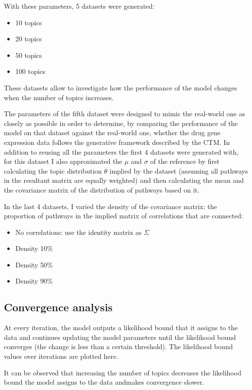 \documentclass[12pt,a4paper,twoside,openright]{report}
\begin{document}
With these parameters, 5 datasets were generated:

\begin{itemize}[noitemsep]
\item 10 topics
\item 20 topics
\item 50 topics
\item 100 topics
\end{itemize}

These datasets allow to investigate how the performance of the model changes when the number of topics increases.

The parameters of the fifth dataset were designed to mimic the real-world one as closely as possible in order to determine, by comparing the performance of the model on that dataset against the real-world one, whether the drug gene expression data follows the generative framework described by the CTM. In addition to reusing all the parameters the first 4 datasets were generated with, for this dataset I also approximated the $\mu$ and $\sigma$ of the reference by first calculating the topic distribution $\theta$ implied by the dataset (assuming all pathways in the resultant matrix are equally weighted) and then calculating the mean and the covariance matrix of the distribution of pathways based on it.

In the last 4 datasets, I varied the density of the covariance matrix: the proportion of pathways in the implied matrix of correlations that are connected:

\begin{itemize}[noitemsep]
\item No correlations: use the identity matrix as $\Sigma$
\item Density 10\%
\item Density 50\%
\item Density 90\%
\end{itemize}

\subsection{Convergence analysis}

At every iteration, the model outputs a likelihood bound that it assigns to the data and continues updating the model parameters until the likelihood bound converges (the change is less than a certain threshold). The likelihood bound values over iterations are plotted here.

It can be observed that increasing the number of topics decreases the likelihood bound the model assigns to the data andmakes convergence slower.
\end{document}
